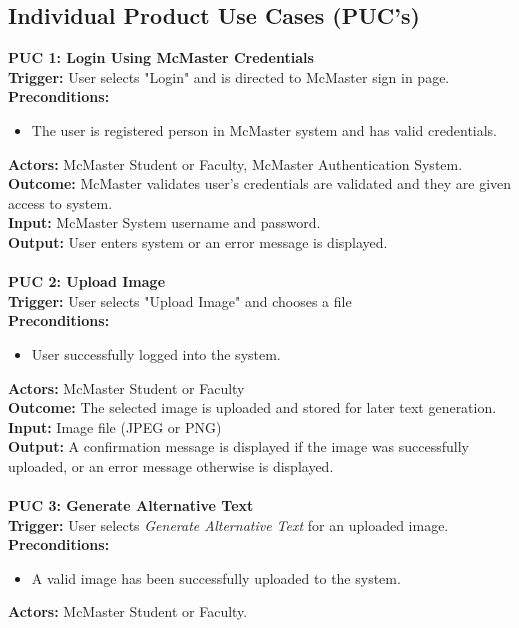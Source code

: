 \documentclass[12pt]{article}
\begin{document}
\subsection{Individual Product Use Cases (PUC's)}
\textbf{PUC 1: Login Using McMaster Credentials }\\
\textbf{Trigger:} User selects "Login" and is directed to McMaster sign in page.\\
\textbf{Preconditions:}
\begin{itemize}
  \item The user is registered person in McMaster system and has valid credentials.
\end{itemize}
\textbf{Actors:} McMaster Student or Faculty, McMaster Authentication System.\\
\textbf{Outcome:} McMaster validates user's credentials are validated and they are given access to system.\\
\textbf{Input:} McMaster System username and password. \\
\textbf{Output:} User enters system or an error message is displayed.\\
\\
\textbf{PUC 2: Upload Image }\\
\textbf{Trigger:} User selects "Upload Image" and chooses a file\\
\textbf{Preconditions:}
\begin{itemize}
  \item User successfully logged into the system.
\end{itemize}
\textbf{Actors:} McMaster Student or Faculty \\
\textbf{Outcome:} The selected image is uploaded and stored for later text generation.\\
\textbf{Input:} Image file (JPEG or PNG) \\
\textbf{Output:} A confirmation message is displayed if the image was successfully uploaded, or an error message otherwise is displayed.\\
\\
\textbf{PUC 3: Generate Alternative Text}\\
\textbf{Trigger:} User selects \textit{Generate Alternative Text} for an uploaded image.\\
\textbf{Preconditions:}
\begin{itemize}
  \item A valid image has been successfully uploaded to the system. 
\end{itemize}
\textbf{Actors:} McMaster Student or Faculty.\\
\end{document}
